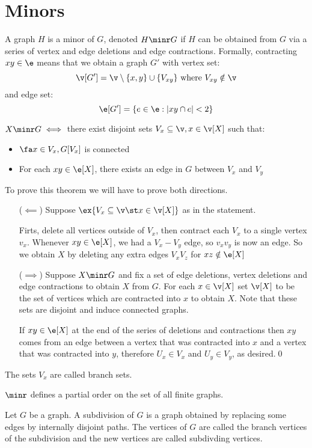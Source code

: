 \section{Minors}
A graph $H$ is a minor of $G$, denoted $H \minr G$ if $H$ can be obtained from $G$ via a series of vertex and edge deletions and edge contractions. Formally, contracting $xy \in \e$ means that we obtain a graph $G'$ with vertex set:
\begin{equation*}
    \v[G'] = \v \setminus \{x, y\} \cup \{V_{xy}\} \text{ where } V_{xy} \notin \v
\end{equation*}
and edge set:
\begin{equation*}
    \e[G'] = \{e \in \e: |xy \cap e| < 2\}
\end{equation*}
\begin{customproposition}{1.25}
    \label{proposition:1.25}
    $X \minr G \iff$ there exist disjoint sets $V_x \subseteq \v, x \in \v[X]$ such that:
    \begin{itemize}
        \item $\fa x \in V_x, G[V_x]$ is connected
        \item For each $xy \in \e[X]$, there exists an edge in $G$ between $V_x$ and $V_y$
    \end{itemize}
\end{customproposition}
\begin{prf}
    To prove this theorem we will have to prove both directions.
    \begin{itemize}
        \item [($\impliedby$)] Suppose $\ex \{V_x \subseteq \v \st x \in \v[X]\}$ as in the statement.
        
        Firts, delete all vertices outside of $V_x$, then contract each $V_x$ to a single vertex $v_x$. Whenever $xy \in \e[X]$, we had a $V_x - V_y$ edge, so $v_xv_y$ is now an edge. So we obtain $X$ by deleting any extra edges $V_xV_z$ for $xz \notin \e[X]$
        \item [($\implies$)] Suppose $X \minr G$ and fix a set of edge deletions, vertex deletions and edge contractions to obtain $X$ from $G$. For each $x \in \v[X]$ set $\v[X]$ to be the set of vertices which are contracted into $x$ to obtain $X$. Note that these sets are disjoint and induce connected graphs.
        
        If $xy \in \e[X]$ at the end of the series of deletions and contractions then $xy$ comes from an edge between a vertex that was contracted into $x$ and a vertex that was contracted into $y$, therefore $U_x \in V_x$ and $U_y \in V_y$, as desired.\qed
    \end{itemize}
\end{prf}
The sets $V_x$ are called branch sets.
\begin{customproposition}{1.26}
    \label{proposition:1.26}
    $\minr$ defines a partial order on the set of all finite graphs.
\end{customproposition}
Let $G$ be a graph. A subdivision of $G$ is a graph obtained by replacing some edges by internally disjoint paths. The vertices of $G$ are called the branch vertices of the subdivision and the new vertices are called subdivding vertices.

